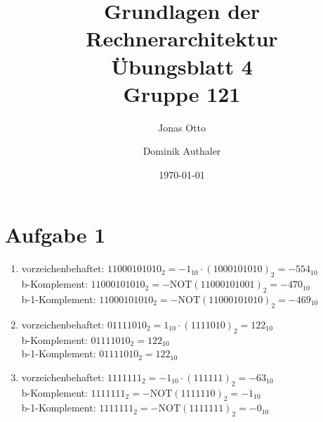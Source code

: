\documentclass[a4paper]{article}
\title{Grundlagen der Rechnerarchitektur\\ Übungsblatt 4\\Gruppe 121\\}
\author{Jonas Otto\and Dominik Authaler}
\date{\today}
\begin{document}
\maketitle

\section*{Aufgabe 1}
\begin{enumerate}[label=\alph*)]
\item vorzeichenbehaftet: $11000101010_2 = -1_{10} \cdot (1000101010)_2 = -554_{10}$ \\
	  b-Komplement: $11000101010_2 = -\text{NOT}(11000101001)_2 = -470_{10}$ \\
      b-1-Komplement: $11000101010_2 = -\text{NOT}(11000101010)_2 = -469_{10}$
\item vorzeichenbehaftet: $01111010_2 = 1_{10} \cdot (1111010)_2 = 122_{10}$ \\
      b-Komplement: $01111010_2 = 122_{10}$ \\
      b-1-Komplement: $01111010_2 = 122_{10}$
\item vorzeichenbehaftet: $1111111_2 = -1_{10} \cdot (111111)_2 = -63_{10}$ \\
      b-Komplement: $1111111_2 = -\text{NOT}(1111110)_2 = -1_{10}$ \\
      b-1-Komplement: $1111111_2 = -\text{NOT}(1111111)_2 = -0_{10}$
\end{enumerate}
\end{document}
